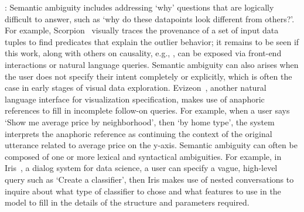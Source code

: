 : Semantic ambiguity 
includes addressing `why' questions 
that are logically difficult to answer, 
such as `why do these datapoints look different from others?'. 
For example, Scorpion~\cite{Wu2013} visually traces the provenance 
of a set of input data tuples to find predicates 
that explain the outlier behavior;
it remains to be seen if this work, along with others
on causality, e.g., \cite{meliou2010causality,roy2014formal},
can be exposed via front-end interactions or natural language
queries. 
Semantic ambiguity can also arises 
when the user does not specify their 
intent completely or explicitly, 
which is often the case in early stages 
of visual data exploration. 
Evizeon~\cite{Hoque2017}, 
another natural language interface for visualization
specification, 
makes use of anaphoric references 
to fill in incomplete follow-on queries. 
For example, when a user says 
`Show me average price by neighborhood', 
then `by home type', the system interprets 
the anaphoric reference as continuing the 
context of the original utterance related 
to average price on the y-axis. 
Semantic ambiguity can often be composed 
of one or more lexical and syntactical ambiguities. 
For example, in Iris~\cite{Fast2018}, a dialog system for
data science, 
a user can specify a vague, 
high-level query such as `Create a classifier', 
then Iris makes use of nested conversations 
to inquire about what type of classifier 
to chose and what features to use in the model 
to fill in the details of the structure and parameters required. 


